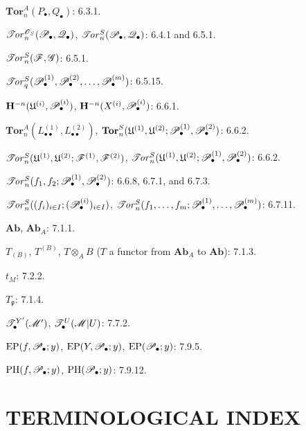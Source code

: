 \begin{flushleft}
$\mathbf{Tor}_n^A(P_\bullet,Q_\bullet)$: 6.3.1.

\medskip
$\mathscr{T}\!\mathit{or}_n^{\mathscr{O}_S}(\mathscr{P}_\bullet,\mathscr{Q}_\bullet)$,
$\mathscr{T}\!\mathit{or}_n^S(\mathscr{P}_\bullet,\mathscr{Q}_\bullet)$: 6.4.1 and 6.5.1.

\medskip
$\mathscr{T}\!\mathit{or}_n^S(\mathscr{F},\mathscr{G})$: 6.5.1.

\medskip
$\mathscr{T}\!\mathit{or}_q^S(\mathscr{P}_\bullet^{(1)},\mathscr{P}_\bullet^{(2)},\ldots,
\mathscr{P}_\bullet^{(m)})$: 6.5.15.

\medskip
$\mathbf H^{-n}(\mathfrak U^{(i)},\mathscr{P}_\bullet^{(i)})$,
$\mathbf H^{-n}(X^{(i)},\mathscr{P}_\bullet^{(i)})$: 6.6.1.

\medskip
$\mathbf{Tor}_n^A(L_{\bullet\bullet}^{(1)},L_{\bullet\bullet}^{(2)})$,
$\mathbf{Tor}_n^S(\mathfrak U^{(1)},\mathfrak U^{(2)};
\mathscr{P}_\bullet^{(1)},\mathscr{P}_\bullet^{(2)})$: 6.6.2.

\medskip
$\mathscr{T}\!\mathit{or}_n^S(\mathfrak U^{(1)},\mathfrak U^{(2)};
\mathscr{F}^{(1)},\mathscr{F}^{(2)})$,
$\mathscr{T}\!\mathit{or}_n^S(\mathfrak U^{(1)},\mathfrak U^{(2)};
\mathscr{P}_\bullet^{(1)},\mathscr{P}_\bullet^{(2)})$: 6.6.2.

\medskip
$\mathscr{T}\!\mathit{or}_n^S(f_1,f_2;\mathscr{P}_\bullet^{(1)},
\mathscr{P}_\bullet^{(2)})$: 6.6.8, 6.7.1, and 6.7.3.

\medskip
$\mathscr{T}\!\mathit{or}_n^S((f_i)_{i\in I};(\mathscr{P}_\bullet^{(i)})_{i\in I})$,
$\mathscr{T}\!\mathit{or}_n^S(f_1,\ldots,f_m;\mathscr{P}_\bullet^{(1)},\ldots,
\mathscr{P}_\bullet^{(m)})$: 6.7.11.

\medskip
$\mathbf{Ab}$, $\mathbf{Ab}_A$: 7.1.1.

\medskip
$T_{(B)}$, $T^{(B)}$, $T\otimes_A B$
($T$ a functor from $\mathbf{Ab}_A$ to $\mathbf{Ab}$): 7.1.3.

\medskip
$t_M$: 7.2.2.

\medskip
$T_{\mathfrak p}$: 7.1.4.

\medskip
$\mathscr{T}_\bullet^{Y'}(\mathscr{M}')$,
$\mathscr{T}_\bullet^U(\mathscr{M}|U)$: 7.7.2.

\medskip
$\operatorname{EP}(f,\mathscr{P}_\bullet;y)$,
$\operatorname{EP}(Y,\mathscr{P}_\bullet;y)$,
$\operatorname{EP}(\mathscr{P}_\bullet;y)$: 7.9.5.

\medskip
$\operatorname{PH}(f,\mathscr{P}_\bullet;y)$,
$\operatorname{PH}(\mathscr{P}_\bullet;y)$: 7.9.12.
\end{flushleft}

\clearpage
{}
\section*{TERMINOLOGICAL INDEX}

